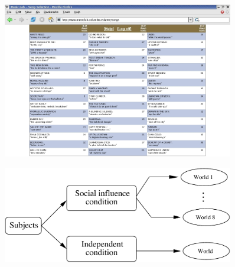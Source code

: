 \documentclass[aspectratio=169]{beamer}
\begin{document}
\begin{frame}

\begin{figure}
  \centering
  \includegraphics[width = 0.9\textwidth]{figures/info-v1-cut}
\end{figure}

\end{frame}
\begin{frame}

\begin{figure}
  \centering
  \includegraphics[width=0.9\textwidth]{figures/expdesign_4}
\end{figure}

\end{frame}
\end{document}
